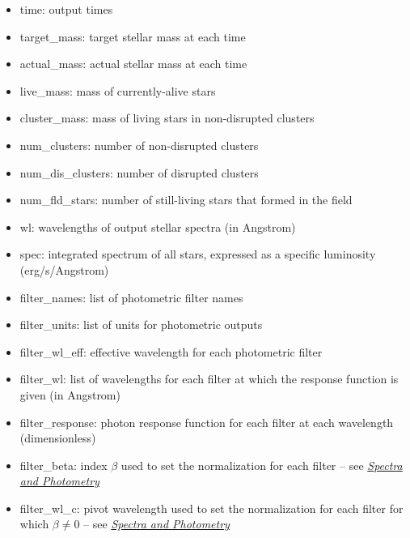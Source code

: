 \documentclass[letterpaper,10pt,english]{sphinxmanual}
\begin{document}
\begin{itemize}
\item {} 
time: output times

\item {} 
target\_mass: target stellar mass at each time

\item {} 
actual\_mass: actual stellar mass at each time

\item {} 
live\_mass: mass of currently-alive stars

\item {} 
cluster\_mass: mass of living stars in non-disrupted clusters

\item {} 
num\_clusters: number of non-disrupted clusters

\item {} 
num\_dis\_clusters: number of disrupted clusters

\item {} 
num\_fld\_stars: number of still-living stars that formed in the field

\item {} 
wl: wavelengths of output stellar spectra (in Angstrom)

\item {} 
spec: integrated spectrum of all stars, expressed as a specific luminosity (erg/s/Angstrom)

\item {} 
filter\_names: list of photometric filter names

\item {} 
filter\_units: list of units for photometric outputs

\item {} 
filter\_wl\_eff: effective wavelength for each photometric filter

\item {} 
filter\_wl: list of wavelengths for each filter at which the response function is given (in Angstrom)

\item {} 
filter\_response: photon response function for each filter at each wavelength (dimensionless)

\item {} 
filter\_beta: index \(\beta\) used to set the normalization for each filter -- see {\hyperref[intro:ssec\string-spec\string-phot]{\emph{Spectra and Photometry}}}

\item {} 
filter\_wl\_c: pivot wavelength used to set the normalization for each filter for which \(\beta \neq 0\) -- see {\hyperref[intro:ssec\string-spec\string-phot]{\emph{Spectra and Photometry}}}


\end{itemize}
\end{document}
